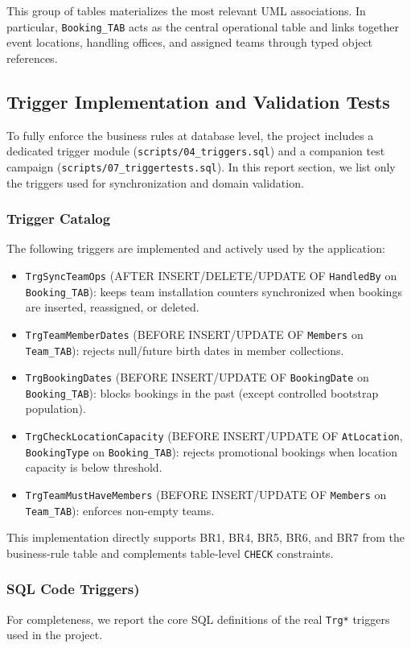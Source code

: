 \documentclass[12pt,a4paper]{article}
\begin{document}
This group of tables materializes the most relevant UML associations. In particular, \texttt{Booking\_TAB} acts as the central operational table and links together event locations, handling offices, and assigned teams through typed object references.

\subsection{Trigger Implementation and Validation Tests}
To fully enforce the business rules at database level, the project includes a dedicated trigger module (\texttt{scripts/04\_triggers.sql}) and a companion test campaign (\texttt{scripts/07\_triggertests.sql}).
In this report section, we list only the triggers used for synchronization and domain validation.

\subsubsection*{Trigger Catalog}
The following triggers are implemented and actively used by the application:
\begin{itemize}
    \item \texttt{TrgSyncTeamOps} (AFTER INSERT/DELETE/UPDATE OF \texttt{HandledBy} on \texttt{Booking\_TAB}): keeps team installation counters synchronized when bookings are inserted, reassigned, or deleted.
    \item \texttt{TrgTeamMemberDates} (BEFORE INSERT/UPDATE OF \texttt{Members} on \texttt{Team\_TAB}): rejects null/future birth dates in member collections.
    \item \texttt{TrgBookingDates} (BEFORE INSERT/UPDATE OF \texttt{BookingDate} on \texttt{Booking\_TAB}): blocks bookings in the past (except controlled bootstrap population).
    \item \texttt{TrgCheckLocationCapacity} (BEFORE INSERT/UPDATE OF \texttt{AtLocation}, \texttt{BookingType} on \texttt{Booking\_TAB}): rejects promotional bookings when location capacity is below threshold.
    \item \texttt{TrgTeamMustHaveMembers} (BEFORE INSERT/UPDATE OF \texttt{Members} on \texttt{Team\_TAB}): enforces non-empty teams.
\end{itemize}

This implementation directly supports BR1, BR4, BR5, BR6, and BR7 from the business-rule table and complements table-level \texttt{CHECK} constraints.

\subsubsection*{SQL Code Triggers)}
For completeness, we report the core SQL definitions of the real \texttt{Trg*} triggers used in the project.
\end{document}
